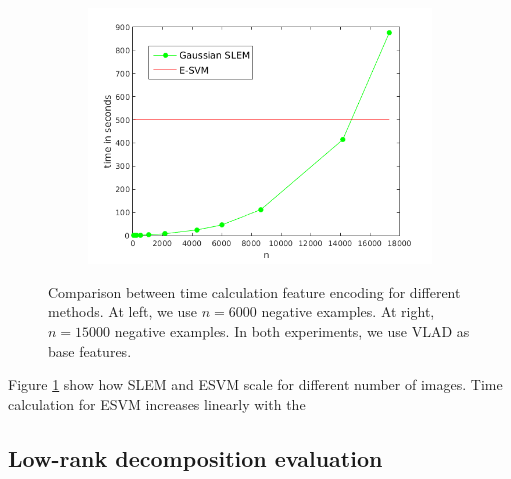 \begin{figure}[!h]
\begin{subfigure}[b]{0.32\textwidth}
\end{subfigure}
\begin{subfigure}[b]{0.32\textwidth}
\includegraphics[width=\textwidth]{speed_n.png}
\end{subfigure}
\caption{Comparison between time calculation feature encoding for different methods. At left, we use $n=6000$ negative examples. At right, $n=15000$ negative examples. In both experiments, we use VLAD as base features.}
\label{time:scalar}
\end{figure}
Figure \ref{time:scalar} show how SLEM and ESVM scale for different number of images. Time calculation for ESVM increases linearly with the 

\subsection{Low-rank decomposition evaluation}

